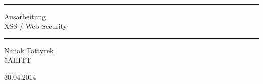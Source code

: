 
\begin{titlepage}

\ 

 \vspace{3cm} 
 
 {\begin{center} \bfseries\LARGE

\rule{10cm}{1mm}  

Ausarbeitung  \\[5mm] XSS / Web Security

\rule{10cm}{1mm}  
  
 \end{center}}
 
 {\begin{flushright} \bfseries\large
 
   \vspace{4cm} 
 
  
  Nanak Tattyrek \\[5mm]
  
  5AHITT
 
   \vfill
  
  
  30.04.2014 \\[8mm]
 

 \end{flushright}}
 
\end{titlepage}